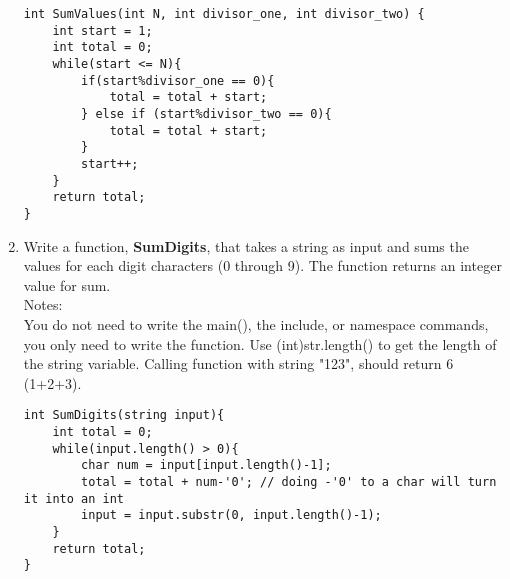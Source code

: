 \documentclass{article}
\begin{document}
\begin{enumerate}
\begin{lstlisting}
int SumValues(int N, int divisor_one, int divisor_two) {
    int start = 1;
    int total = 0;
    while(start <= N){
        if(start%divisor_one == 0){
            total = total + start;
        } else if (start%divisor_two == 0){
            total = total + start;
        }
        start++;
    }
    return total;
}
\end{lstlisting}

	\item Write a function, \textbf{SumDigits}, that takes a string as input and sums the values for each digit characters (0 through 9). The function returns an integer value for sum.\\
Notes:\\
You do not need to write the main(), the include, or namespace commands, you only need to write the function. 
Use (int)str.length() to get the length of the string variable.
Calling function with string "123", should return 6 (1+2+3).

\begin{lstlisting}
int SumDigits(string input){
    int total = 0;
    while(input.length() > 0){
        char num = input[input.length()-1];
        total = total + num-'0'; // doing -'0' to a char will turn it into an int
        input = input.substr(0, input.length()-1);
    }
    return total;
}
\end{lstlisting}

\end{enumerate}
\end{document}
